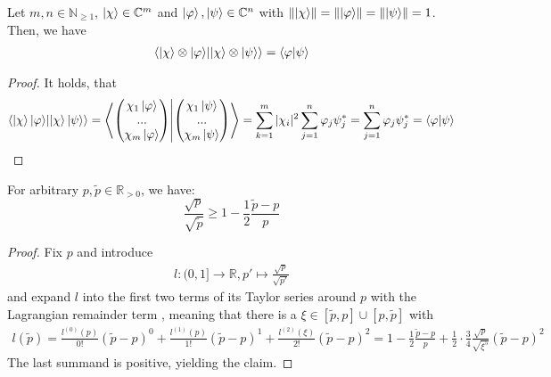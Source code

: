 \begin{lemma} \label{inner_tensor_prod_lemma}
    Let \(m, n \in \mathbb{N}_{\geq 1}\), \(\ket{\chi} \in \mathbb{C}^m\) and \(\ket{\varphi}, \ket{\psi} \in \mathbb{C}^n\) with \(\norm{\ket{\chi}} = \norm{\ket{\varphi}} = \norm{\ket{\psi}} = 1\). Then, we have
    \begin{align}
        \braket{\ket{\chi} \otimes \ket{\varphi}}{\ket{\chi} \otimes \ket{\psi}} = \braket{\varphi}{\psi}
    \end{align}
\end{lemma}

\begin{proof}
    It holds, that
    \begin{align}
        \braket{\ket{\chi}\ket{\varphi}}{\ket{\chi}\ket{\psi}} = \braket{\begin{pmatrix}
            \chi_1\ket{\varphi}\\
            ...\\
            \chi_m\ket{\varphi}
        \end{pmatrix}}{\begin{pmatrix}
            \chi_1\ket{\psi}\\
            ...\\
            \chi_m\ket{\psi}
        \end{pmatrix}} = \sum_{k=1}^m |\chi_i|^2 \sum_{j=1}^n \varphi_j\psi_j^* = \sum_{j=1}^n \varphi_j\psi_j^* = \braket{\varphi}{\psi}
    \end{align}
\end{proof}

\begin{lemma} \label{inverse_sqrt_taylor_inequality}
    For arbitrary \(p, \tilde{p} \in \mathbb{R}_{> 0}\), we have:
    \[
        \frac{\sqrt{p}}{\sqrt{\tilde{p}}} \geq 1 - \frac{1}{2} \frac{\tilde{p}-p}{p}
    \]
\end{lemma}

\begin{proof}
    Fix \(p\) and introduce
    \begin{align}
        l\colon (0, 1] \to \mathbb{R}, p' \mapsto \frac{\sqrt{p}}{\sqrt{p'}}
    \end{align}
    and expand \(l\) into the first two terms of its Taylor series around \(p\) with the Lagrangian remainder term \cite[p. 284]{Forster2016}, meaning that there is a \(\xi \in [\tilde{p}, p] \cup [p, \tilde{p}]\) with
    \begin{align}
        l(\tilde{p}) = \frac{l^{(0)}(p)}{0!}(\tilde{p}-p)^0 + \frac{l^{(1)}(p)}{1!}(\tilde{p}-p)^1+\frac{l^{(2)}(\xi)}{2!}(\tilde{p}-p)^2 = 1 - \frac{1}{2}\frac{\tilde{p}-p}{p}+\frac{1}{2} \cdot \frac{3}{4}\frac{\sqrt{p}}{\sqrt{\xi^5}}(\tilde{p}-p)^2
    \end{align}
    The last summand is positive, yielding the claim.
\end{proof}

